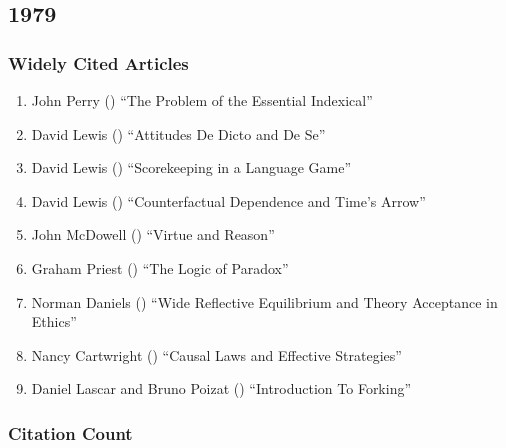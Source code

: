 \documentclass[
  10pt,
  letterpaper,
  DIV=11,
  numbers=noendperiod,
  twoside]{scrartcl}
\providecommand{\tightlist}{%
  \setlength{\itemsep}{0pt}\setlength{\parskip}{0pt}}\usepackage{longtable,booktabs,array}
\begin{document}
\newpage

\subsection{1979}\label{sec-s1979}

\subsubsection*{Widely Cited Articles}\label{widely-cited-articles-22}

\begin{enumerate}
\def\labelenumi{\arabic{enumi}.}
\tightlist
\item
  John Perry () ``The Problem of
  the Essential Indexical''
\item
  David Lewis () ``Attitudes De
  Dicto and De Se''
\item
  David Lewis () ``Scorekeeping
  in a Language Game''
\item
  David Lewis ()
  ``Counterfactual Dependence and Time's Arrow''
\item
  John McDowell () ``Virtue and
  Reason''
\item
  Graham Priest () ``The Logic of
  Paradox''
\item
  Norman Daniels () ``Wide
  Reflective Equilibrium and Theory Acceptance in Ethics''
\item
  Nancy Cartwright () ``Causal
  Laws and Effective Strategies''
\item
  Daniel Lascar and Bruno Poizat
  () ``Introduction To Forking''
\end{enumerate}

\subsubsection*{Citation Count}\label{sec-count-1979}
\end{document}
